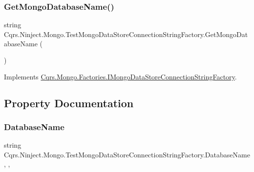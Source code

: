 \subsubsection{\texorpdfstring{Get\+Mongo\+Database\+Name()}{GetMongoDatabaseName()}}
{\footnotesize\ttfamily string Cqrs.\+Ninject.\+Mongo.\+Test\+Mongo\+Data\+Store\+Connection\+String\+Factory.\+Get\+Mongo\+Database\+Name (\begin{DoxyParamCaption}{ }\end{DoxyParamCaption})}



Implements \hyperlink{interfaceCqrs_1_1Mongo_1_1Factories_1_1IMongoDataStoreConnectionStringFactory_a90de27c2bf23d7f9412d55c09ab2ec8c_a90de27c2bf23d7f9412d55c09ab2ec8c}{Cqrs.\+Mongo.\+Factories.\+I\+Mongo\+Data\+Store\+Connection\+String\+Factory}.



\subsection{Property Documentation}
\mbox{\label{classCqrs_1_1Ninject_1_1Mongo_1_1TestMongoDataStoreConnectionStringFactory_a911d570725e6702a9c1d16321202d89f_a911d570725e6702a9c1d16321202d89f}} 
\subsubsection{\texorpdfstring{Database\+Name}{DatabaseName}}
{\footnotesize\ttfamily string Cqrs.\+Ninject.\+Mongo.\+Test\+Mongo\+Data\+Store\+Connection\+String\+Factory.\+Database\+Name\hspace{0.3cm}{\ttfamily [static]}, {\ttfamily [get]}, {\ttfamily [set]}}

